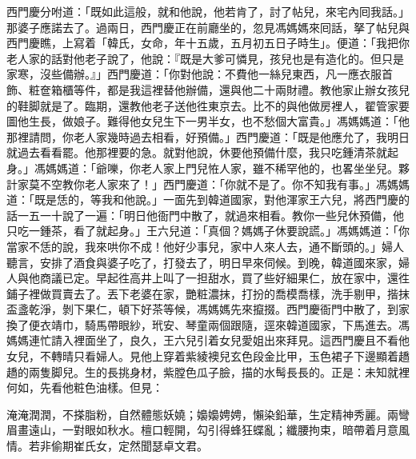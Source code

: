 西門慶分咐道：「既如此這般，就和他說，他若肯了，討了帖兒，來宅內囘我話。」那婆子應諾去了。過兩日，西門慶正在前廳坐的，忽見馮媽媽來囘話，拏了帖兒與西門慶瞧，上寫着「韓氏，女命，年十五歲，五月初五日子時生」。便道：「我把你老人家的話對他老子說了，他說：『既是大爹可憐見，孩兒也是有造化的。但只是家寒，沒些備辦。』」西門慶道：「你對他說：不費他一絲兒東西，凡一應衣服首飾、粧奩箱櫃等件，都是我這裡替他辦備，還與他二十兩財禮。教他家止辦女孩兒的鞋脚就是了。臨期，還教他老子送他徃東京去。比不的與他做房裡人，翟管家要圖他生長，做娘子。難得他女兒生下一男半女，也不愁個大富貴。」馮媽媽道：「他那裡請問，你老人家幾時過去相看，好預備。」西門慶道：「既是他應允了，我明日就過去看看罷。他那裡要的急。就對他說，休要他預備什麼，我只吃鍾清茶就起身。」馮媽媽道：「爺嚛，你老人家上門兒恠人家，雖不稀罕他的，也畧坐坐兒。夥計家莫不空教你老人家來了！」西門慶道：「你就不是了。你不知我有事。」馮媽媽道：「既是恁的，等我和他說。」一面先到韓道國家，對他渾家王六兒，將西門慶的話一五一十說了一遍：「明日他衙門中散了，就過來相看。教你一些兒休預備，他只吃一鍾茶，看了就起身。」王六兒道：「真個？媽媽子休要說謊。」馮媽媽道：「你當家{}不恁的說，我來哄你不成！他好少事兒，家中人來人去，通不斷頭的。」婦人聽言，安排了酒食與婆子吃了，打發去了，明日早來伺候。到晚，韓道國來家，婦人與他商議已定。早起徃高井上叫了一担甜水，買了些好細果仁，放在家中，還徃鋪子裡做買賣去了。丟下老婆在家，{}艷粧濃抹，打扮的喬模喬樣，洗手剔甲，揩抹盃盞乾淨，剝下果仁，頓下好茶等候，馮媽媽先來攛掇。西門慶衙門中散了，到家換了便衣靖巾，騎馬帶眼紗，玳安、琴童兩個跟隨，逕來韓道國家，下馬進去。馮媽媽連忙請入裡面坐了，良久，王六兒引着女兒愛姐出來拜見。這西門慶且不看他女兒，不轉晴只看婦人。見他上穿着紫綾襖兒玄色段金比甲，玉色裙子下邊顯着趫趫的兩隻脚兒。生的長挑身材，紫膛色瓜子臉，描的水髩長長的。{}正是：未知就裡何如，先看他粧色油樣。但見：

\begin{myquote}
淹淹潤潤，不搽脂粉，自然體態妖嬈；嬝嬝娉娉，懶染鉛華，生定精神秀麗。兩彎眉畫遠山，一對眼如秋水。檀口輕開，勾引得蜂狂蝶亂；纖腰拘束，暗帶着月意風情。若非偷期崔氏女，定然聞瑟卓文君。
\end{myquote}

